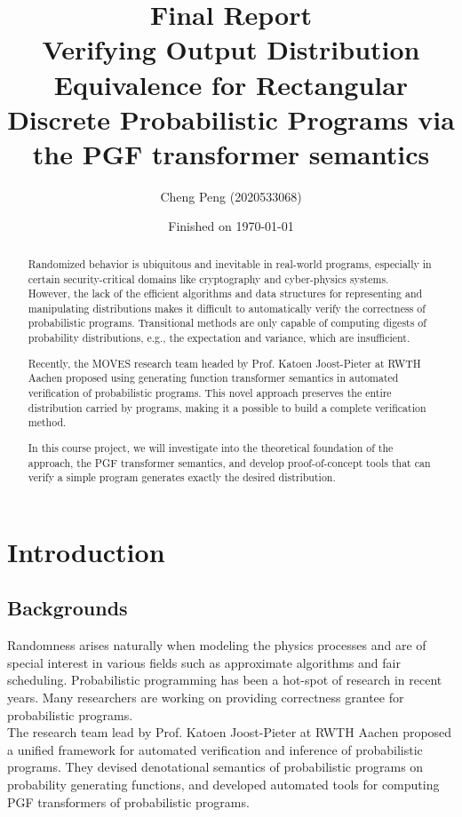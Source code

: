 \documentclass[a4paper]{article}
\title{Final Report\\
	\small Verifying Output Distribution Equivalence for Rectangular Discrete Probabilistic Programs via the PGF transformer semantics
}
\date{Finished on \today}
\author{Cheng Peng (2020533068)}
\begin{document}
\maketitle

\begin{abstract}
	Randomized behavior is ubiquitous and inevitable in real-world programs, especially in certain security-critical domains like cryptography and cyber-physics systems.
	However, the lack of the efficient algorithms and data structures for representing and manipulating distributions makes it difficult to automatically verify the correctness of probabilistic programs.
	Transitional methods are only capable of computing digests of probability distributions, e.g., the expectation and variance, which are insufficient.\par
	Recently, the MOVES research team headed by Prof. Katoen Joost-Pieter at RWTH Aachen proposed using generating function transformer semantics in automated verification of probabilistic programs.
	This novel approach preserves the entire distribution carried by programs, making it a possible to build a complete verification method.\par
	In this course project, we will investigate into the theoretical foundation of the approach, the PGF transformer semantics, and develop proof-of-concept tools that can verify a simple program generates exactly the desired distribution.
\end{abstract}

\section{Introduction}

\subsection{Backgrounds}

Randomness arises naturally when modeling the physics processes and are of special interest in various fields such as approximate algorithms and fair scheduling. Probabilistic programming has been a hot-spot of research in recent years. Many researchers are working on providing correctness grantee for probabilistic programs.\\
The research team lead by Prof. Katoen Joost-Pieter at RWTH Aachen proposed a unified framework for automated verification and inference of probabilistic programs. They devised denotational semantics of probabilistic programs on probability generating functions, and developed automated tools for computing PGF transformers of probabilistic programs.
\end{document}
